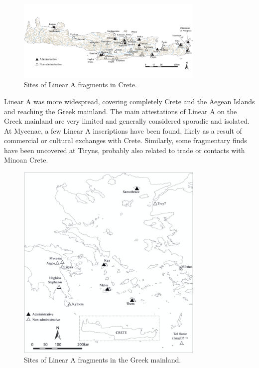 \begin{figure}[H]
    \centering
    \includegraphics[width=0.8\textwidth]{Images/crete_LA.png} %
    \caption{Sites of Linear A fragments in Crete.\protect\footnotemark}
    \label{fig:crete_LA}
\end{figure}

Linear A was more widespread, covering completely Crete and the Aegean Islands and reaching the Greek mainland.
The main attestations of Linear A on the Greek mainland are very limited and generally considered sporadic and isolated. 
At Mycenae, a few Linear A inscriptions have been found, likely as a result of commercial or cultural exchanges with Crete. 
Similarly, some fragmentary finds have been uncovered at Tiryns, probably also related to trade or contacts with Minoan Crete.

\begin{figure}[H]
    \centering
    \includegraphics[width=0.8\textwidth]{Images/mainland_LA.jpg} %
    \caption{Sites of Linear A fragments in the Greek mainland.\protect\footnotemark}
    \label{fig:mainland_LA}
\end{figure}

